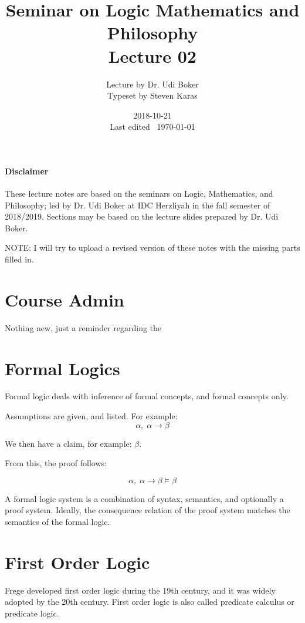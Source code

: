 \documentclass{idc_msc}
\title{Seminar on Logic Mathematics and Philosophy \\\large Lecture 02}
\date{2018-10-21 \\ Last edited \currenttime\ \today}
\author{Lecture by Dr. Udi Boker\\Typeset by Steven Karas}
\begin{document}
\maketitle

\nocite{benacerraf1983philosophy}

\paragraph{Disclaimer}

These lecture notes are based on the seminars on Logic, Mathematics, and Philosophy; led by Dr. Udi Boker at IDC Herzliyah in the fall semester of 2018/2019.
Sections may be based on the lecture slides prepared by Dr. Udi Boker.

NOTE: I will try to upload a revised version of these notes with the missing parts filled in.

\section{Course Admin}

Nothing new, just a reminder regarding the 

\section{Formal Logics}

Formal logic deals with inference of formal concepts, and formal concepts only.

Assumptions are given, and listed.
For example:
\[ \alpha,\; \alpha \to \beta\]

We then have a claim, for example: \(\beta\).

From this, the proof follows:

\[\alpha, \; \alpha \to \beta \models \beta\]

A formal logic system is a combination of syntax, semantics, and optionally a proof system.
Ideally, the consequence relation of the proof system matches the semantics of the formal logic.

\clearpage
\section{First Order Logic}

Frege developed first order logic during the 19th century, and it was widely adopted by the 20th century.
First order logic is also called predicate calculus or predicate logic.
\end{document}
